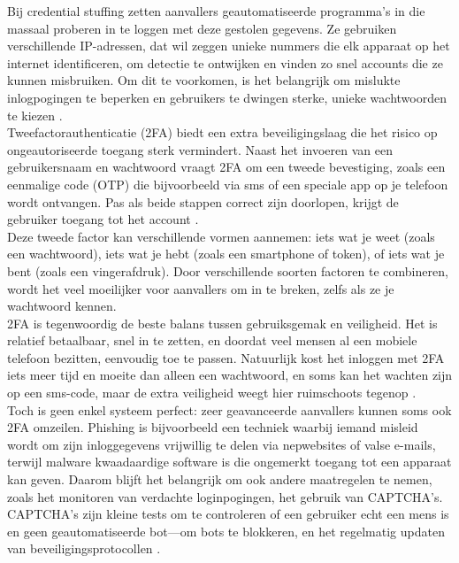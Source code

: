 Bij credential stuffing zetten aanvallers geautomatiseerde programma’s in die massaal proberen in te loggen met deze gestolen gegevens. Ze gebruiken verschillende IP-adressen, dat wil zeggen unieke nummers die elk apparaat op het internet identificeren, om detectie te ontwijken en vinden zo snel accounts die ze kunnen misbruiken. Om dit te voorkomen, is het belangrijk om mislukte inlogpogingen te beperken en gebruikers te dwingen sterke, unieke wachtwoorden te kiezen \autocite{Chinnasamy2025}.\\

Tweefactorauthenticatie (2FA) biedt een extra beveiligingslaag die het risico op ongeautoriseerde toegang sterk vermindert. Naast het invoeren van een gebruikersnaam en wachtwoord vraagt 2FA om een tweede bevestiging, zoals een eenmalige code (OTP) die bijvoorbeeld via sms of een speciale app op je telefoon wordt ontvangen. Pas als beide stappen correct zijn doorlopen, krijgt de gebruiker toegang tot het account \autocite{Jurisons2024}.\\

Deze tweede factor kan verschillende vormen aannemen: iets wat je weet (zoals een wachtwoord), iets wat je hebt (zoals een smartphone of token), of iets wat je bent (zoals een vingerafdruk). Door verschillende soorten factoren te combineren, wordt het veel moeilijker voor aanvallers om in te breken, zelfs als ze je wachtwoord kennen.\\

2FA is tegenwoordig de beste balans tussen gebruiksgemak en veiligheid. Het is relatief betaalbaar, snel in te zetten, en doordat veel mensen al een mobiele telefoon bezitten, eenvoudig toe te passen. Natuurlijk kost het inloggen met 2FA iets meer tijd en moeite dan alleen een wachtwoord, en soms kan het wachten zijn op een sms-code, maar de extra veiligheid weegt hier ruimschoots tegenop \autocite{Jurisons2024}.\\

Toch is geen enkel systeem perfect: zeer geavanceerde aanvallers kunnen soms ook 2FA omzeilen. Phishing is bijvoorbeeld een techniek waarbij iemand misleid wordt om zijn inloggegevens vrijwillig te delen via nepwebsites of valse e-mails, terwijl malware kwaadaardige software is die ongemerkt toegang tot een apparaat kan geven. Daarom blijft het belangrijk om ook andere maatregelen te nemen, zoals het monitoren van verdachte loginpogingen, het gebruik van CAPTCHA’s. CAPTCHA's zijn kleine tests om te controleren of een gebruiker echt een mens is en geen geautomatiseerde bot—om bots te blokkeren, en het regelmatig updaten van beveiligingsprotocollen \autocite{Chinnasamy2025}.\\


